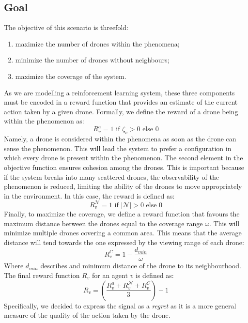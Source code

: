 \subsection{Goal}
 The objective of this scenario is threefold:
\begin{enumerate}
\item maximize the number of drones within the phenomena;
\item minimize the number of drones without neighbours;
\item maximize the coverage of the system.
\end{enumerate}
As we are modelling a reinforcement learning system, 
 these three components must be encoded in a reward function 
 that provides an estimate of the current action taken by a given drone.
% 
Formally, we define the reward of a drone being within the phenomenon as:
\begin{equation}
R^a_{v} = 1 \text{ if } \zeta_v > 0 \text{ else } 0  
\end{equation}
Namely, a drone is considered within the phenomena as soon as the drone can sense the phenomenon.
%
This will lead the system to prefer a configuration in which every drone is present within the phenomenon.
%
The second element in the objective function ensures cohesion among the drones. 
 This is important because if the system breaks into many scattered drones, 
 the observability of the phenomenon is reduced, 
 limiting the ability of the drones to move appropriately in the environment.
 In this case, the reward is defined as:
\begin{equation*}
R^{\mathcal{N}}_{v} = 1 \text{ if } |\mathcal{N}| > 0 \text{ else } 0
\end{equation*}
Finally, to maximize the coverage, 
  we define a reward function that favours the maximum distance between the drones
  equal to the coverage range $\omega$. 
  This will minimize multiple drones covering a common area.
%
This means that the average distance will tend towards the one expressed by the viewing range of each drone:
% 
\begin{equation*}
R^{C}_{v} = 1 - \frac{d_{min}}{\omega}
\end{equation*}
Where $d_{min}$ describes and minimum distance of the drone to its neighbourhood. 
%
The final reward function $R_{v}$ for an agent $v$ is defined as:
\begin{equation*}
 R_{v} = (\frac{R^a_{v} + R^{\mathcal{N}}_{v} + R^{C}_{v}}{3}) - 1  
\end{equation*}
Specifically, we decided to express the signal as a \emph{regret}
  as it is a more general measure of the quality of the action taken by the drone.
%
